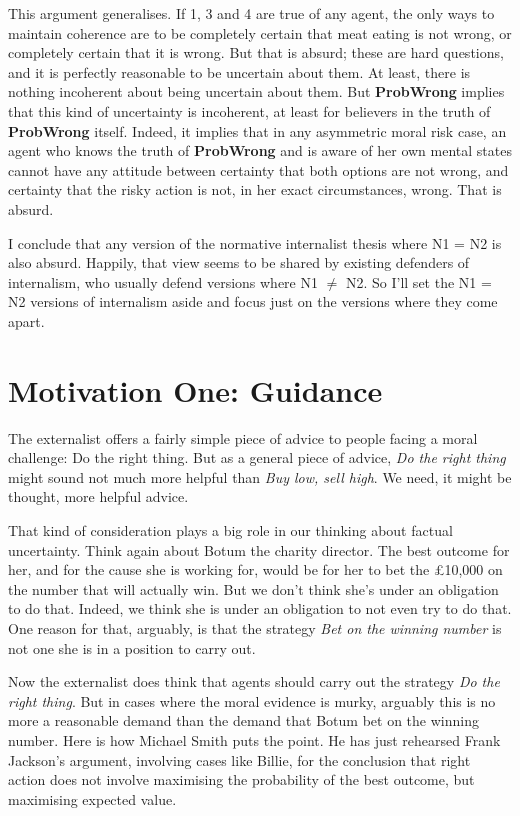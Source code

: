 This argument generalises. If 1, 3 and 4 are true of any agent, the only ways to maintain coherence are to be completely certain that meat eating is not wrong, or completely certain that it is wrong. But that is absurd; these are hard questions, and it is perfectly reasonable to be uncertain about them. At least, there is nothing incoherent about being uncertain about them. But \textbf{ProbWrong} implies that this kind of uncertainty is incoherent, at least for believers in the truth of \textbf{ProbWrong} itself. Indeed, it implies that in any asymmetric moral risk case, an agent who knows the truth of \textbf{ProbWrong} and is aware of her own mental states cannot have any attitude between certainty that both options are not wrong, and certainty that the risky action is not, in her exact circumstances, wrong. That is absurd.

I conclude that any version of the normative internalist thesis where N1 = N2 is also absurd. Happily, that view seems to be shared by existing defenders of internalism, who usually defend versions where N1 $\neq$ N2. So I'll set the N1 = N2 versions of internalism aside and focus just on the versions where they come apart.

\section{Motivation One: Guidance}
\label{motivationone:guidance}

The externalist offers a fairly simple piece of advice to people facing a moral challenge: Do the right thing. But as a general piece of advice, \emph{Do the right thing} might sound not much more helpful than \emph{Buy low, sell high}. We need, it might be thought, more helpful advice.

That kind of consideration plays a big role in our thinking about factual uncertainty. Think again about \gls{Botum} the charity director. The best outcome for her, and for the cause she is working for, would be for her to bet the £10,000 on the number that will actually win. But we don't think she's under an obligation to do that. Indeed, we think she is under an obligation to not even try to do that. One reason for that, arguably, is that the strategy \emph{Bet on the winning number} is not one she is in a position to carry out.

Now the externalist does think that agents should carry out the strategy \emph{Do the right thing}. But in cases where the moral evidence is murky, arguably this is no more a reasonable demand than the demand that \gls{Botum} bet on the winning number. Here is how Michael Smith puts the point. He has just rehearsed \gls{Frank} Jackson's argument, involving cases like \gls{Billie}, for the conclusion that right action does not involve maximising the probability of the best outcome, but maximising expected value.

